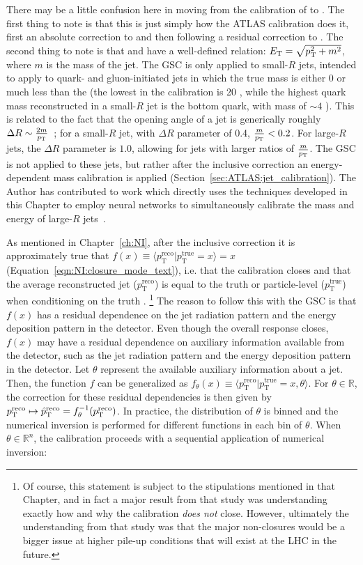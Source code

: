 There may be a little confusion here in moving from the calibration of \Et{} to \pt{}.
The first thing to note is that this is just simply how the ATLAS calibration does it, first an absolute correction to \Et{} and then following a residual correction to \pt{}.
The second thing to note is that \Et{} and \pt{} have a well-defined relation: $E_{\text{T}}=\sqrt{p_{\text{T}}^2+m^2}$, where $m$ is the mass of the jet.
The GSC is only applied to small-$R$ jets, intended to apply to quark- and gluon-initiated jets in which the true mass is either $0$ or much less than the \pt{} (the lowest \pt{} in the calibration is 20 \GeV, while the highest quark mass reconstructed in a small-$R$ jet is the bottom quark, with mass of $\sim4$ \GeV).
This is related to the fact that the opening angle of a jet is generically roughly $\Delta R \sim \frac{2m}{p_{\text{T}}}$~\cite{Shelton:2013an}; for a small-$R$ jet, with $\Delta R$ parameter of 0.4, $\frac{m}{p_{\text{T}}}<0.2$.
For large-$R$ jets, the $\Delta R$ parameter is $1.0$, allowing for jets with larger ratios of $\frac{m}{p_{\text{T}}}$.
The GSC is not applied to these jets, but rather after the inclusive \Et{} correction an energy-dependent mass calibration is applied (Section~\ref{sec:ATLAS:jet_calibration}).
The Author has contributed to work which directly uses the techniques developed in this Chapter to employ neural networks to simultaneously calibrate the mass and energy of large-$R$ jets~\cite{ATL-PHYS-PUB-2020-001}.

As mentioned in Chapter~\ref{ch:NI}, after the inclusive correction it is approximately true that $f(x)\equiv \langle p_\text{T}^\text{reco}|p_\text{T}^\text{true}=x\rangle = x$ (Equation~\ref{eqn:NI:closure_mode_text}), i.e. that the calibration closes and that the average reconstructed jet \pt{} ($p_\text{T}^\text{reco}$) is equal to the truth or particle-level \pt{} ($p_\text{T}^\text{true}$) when conditioning on the truth \pt{}.
\footnote{Of course, this statement is subject to the stipulations mentioned in that Chapter, and in fact a major result from that study was understanding exactly how and why the calibration \textit{does not} close. However, ultimately the understanding from that study was that the major non-closures would be a bigger issue at higher pile-up conditions that will exist at the LHC in the future.}
The reason to follow this with the GSC is that $f(x)$ has a residual dependence on the jet radiation pattern and the energy deposition pattern in the detector.
Even though the overall response closes, $f(x)$ may have a residual dependence on auxiliary information available from the detector, such as the jet radiation pattern and the energy deposition pattern in the detector.
Let $\theta$ represent the available auxiliary information about a jet.
Then, the function $f$ can be generalized as $f_\theta(x)\equiv \langle p_\text{T}^\text{reco}|p_\text{T}^\text{true}=x,\theta\rangle$.
For $\theta\in\mathbb{R}$, the correction for these residual dependencies is then given by $p_\text{T}^\text{reco}\mapsto \hat{p}_\text{T}^\text{reco} = f_\theta^{-1}(p_\text{T}^\text{reco})$.
In practice, the distribution of $\theta$ is binned and the numerical inversion is performed for different functions in each bin of $\theta$.
When $\theta\in\mathbb{R}^n$, the calibration proceeds with a sequential application of numerical inversion:

